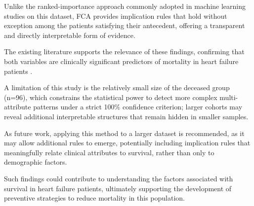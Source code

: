 \documentclass[a4paper,twoside]{article}
\begin{document}
Unlike the ranked-importance approach commonly adopted in machine learning studies on this dataset, FCA provides implication rules that hold without exception among the patients satisfying their antecedent, offering a transparent and directly interpretable form of evidence. 

The existing literature supports the relevance of these findings, confirming that both variables are clinically significant predictors of mortality in heart failure patients \cite{Ahmad2017,ChiccoJurman2020}.

A limitation of this study is the relatively small size of the deceased group (n=96), which constrains the statistical power to detect more complex multi-attribute patterns under a strict 100\% confidence criterion; larger cohorts may reveal additional interpretable structures that remain hidden in smaller samples.

As future work, applying this method to a larger dataset is recommended, as it may allow additional rules to emerge, potentially including implication rules that meaningfully relate clinical attributes to survival, rather than only to demographic factors. 

Such findings could contribute to understanding the factors associated with survival in heart failure patients, ultimately supporting the development of preventive strategies to reduce mortality in this population.



{\small
}
\end{document}
